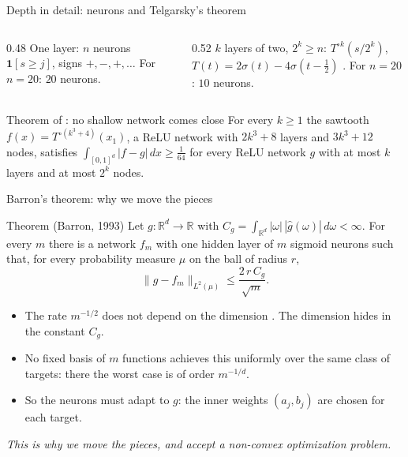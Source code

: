 \documentclass[10pt]{beamer}
\newcommand{\R}{\mathbb{R}}
\begin{document}
\begin{frame}{Depth in detail: neurons and Telgarsky's theorem}
\raggedright
\footnotesize
\begin{columns}[T]
\begin{column}{0.48\textwidth}
\alert{One layer:} $n$ neurons $\mathbf 1[s\ge j]$, signs $+,-,+,\dots$ For $n=20$: $20$ neurons.
\end{column}
\begin{column}{0.52\textwidth}
\alert{$k$ layers of two}, $2^k\ge n$: $T^{\circ k}(s/2^k)$, $T(t)=2\sigma(t)-4\sigma(t-\tfrac12)$ \citep{telgarsky2015}. For $n=20$: $10$ neurons.
\end{column}
\end{columns}

\smallskip
\begin{mathbox}{Theorem of \citet{telgarsky2016}: no shallow network comes close}
For every $k\ge1$ the sawtooth $f(x)=T^{\circ(k^3+4)}(x_1)$, a ReLU network with $2k^3+8$ layers and $3k^3+12$ nodes, satisfies $\int_{[0,1]^d}|f-g|\,dx\ge\tfrac1{64}$ for every ReLU network $g$ with at most $k$ layers and at most $2^k$ nodes.
\end{mathbox}\end{frame}



\begin{frame}{Barron's theorem: why we move the pieces}
\small
\begin{mathbox}{Theorem (Barron, 1993)}
Let $g:\R^d\to\R$ with $C_g=\int_{\R^d}|\omega|\,|\hat g(\omega)|\,d\omega<\infty$. For every $m$ there is a network $f_m$ with one hidden layer of $m$ sigmoid neurons such that, for every probability measure $\mu$ on the ball of radius $r$,
\[
\|g-f_m\|_{L^2(\mu)}\le\frac{2\,r\,C_g}{\sqrt m}.
\]
\end{mathbox}
\begin{itemize}
\item The rate $m^{-1/2}$ \alert{does not depend on the dimension} \citep{barron1993}. The dimension hides in the constant $C_g$.
\item No fixed basis of $m$ functions achieves this uniformly over the same class of targets: there the worst case is of order $m^{-1/d}$.
\item So \alert{the neurons must adapt to $g$}: the inner weights $(a_j,b_j)$ are chosen for each target.
\end{itemize}

\medskip
\begin{center}
\emph{This is why we move the pieces, and accept a non-convex optimization problem.}
\end{center}
\end{frame}
\end{document}
